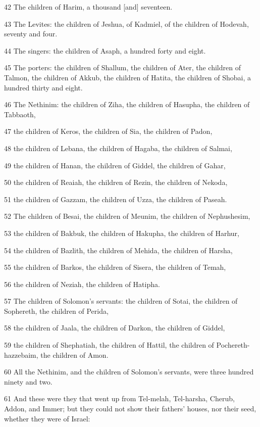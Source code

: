 \par 42 The children of Harim, a thousand [and] seventeen.
\par 43 The Levites: the children of Jeshua, of Kadmiel, of the children of Hodevah, seventy and four.
\par 44 The singers: the children of Asaph, a hundred forty and eight.
\par 45 The porters: the children of Shallum, the children of Ater, the children of Talmon, the children of Akkub, the children of Hatita, the children of Shobai, a hundred thirty and eight.
\par 46 The Nethinim: the children of Ziha, the children of Hasupha, the children of Tabbaoth,
\par 47 the children of Keros, the children of Sia, the children of Padon,
\par 48 the children of Lebana, the children of Hagaba, the children of Salmai,
\par 49 the children of Hanan, the children of Giddel, the children of Gahar,
\par 50 the children of Reaiah, the children of Rezin, the children of Nekoda,
\par 51 the children of Gazzam, the children of Uzza, the children of Paseah.
\par 52 The children of Besai, the children of Meunim, the children of Nephushesim,
\par 53 the children of Bakbuk, the children of Hakupha, the children of Harhur,
\par 54 the children of Bazlith, the children of Mehida, the children of Harsha,
\par 55 the children of Barkos, the children of Sisera, the children of Temah,
\par 56 the children of Neziah, the children of Hatipha.
\par 57 The children of Solomon's servants: the children of Sotai, the children of Sophereth, the children of Perida,
\par 58 the children of Jaala, the children of Darkon, the children of Giddel,
\par 59 the children of Shephatiah, the children of Hattil, the children of Pochereth-hazzebaim, the children of Amon.
\par 60 All the Nethinim, and the children of Solomon's servants, were three hundred ninety and two.
\par 61 And these were they that went up from Tel-melah, Tel-harsha, Cherub, Addon, and Immer; but they could not show their fathers' houses, nor their seed, whether they were of Israel:
